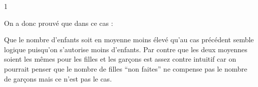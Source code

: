 1\documentclass[a4paper, 11pt,french]{article}
\begin{document}
On a donc prouvé que dans ce cas :


Que le nombre d'enfants soit en moyenne moins élevé qu'au cas précédent semble logique puisqu'on s'autorise moins d'enfants. Par contre que les deux moyennes soient les mêmes pour les filles et les garçons est assez contre intuitif car on pourrait penser que le nombre de filles ``non faites'' ne compense pas le nombre de garçons mais ce n'est pas le cas.






\end{document}
